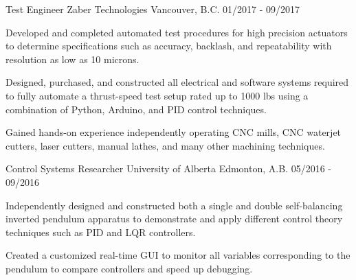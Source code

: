 \begin{cventries}
  \cventry
    {Test Engineer} %
    {Zaber Technologies} %
    {Vancouver, B.C.} %
    {01/2017 - 09/2017} %
    {
      \begin{cvitems}
        \item {Developed and completed automated test procedures for high precision actuators to determine specifications such as accuracy, backlash, and repeatability with resolution as low as 10 microns.}
        \item {Designed, purchased, and constructed all electrical and software systems required to fully automate a thrust-speed test setup rated up to 1000 lbs using a combination of Python, Arduino, and PID control techniques.}
        \item {Gained hands-on experience independently operating CNC mills, CNC waterjet cutters, laser cutters, manual lathes, and many other machining techniques.}
      \end{cvitems}
    }

  \cventry
    {Control Systems Researcher} %
    {University of Alberta} %
    {Edmonton, A.B.} %
    {05/2016 - 09/2016} %
    {
      \begin{cvitems}
        \item {Independently designed and constructed both a single and double self-balancing inverted pendulum apparatus to demonstrate and apply different control theory techniques such as PID and LQR controllers.}
        \item {Created a customized real-time GUI to monitor all variables corresponding to the pendulum to compare controllers and speed up debugging.}
      \end{cvitems}
    }

\end{cventries}

